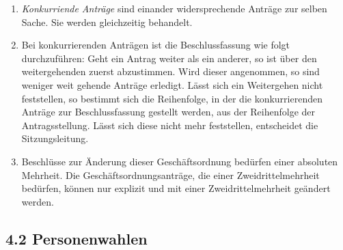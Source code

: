 \documentclass[12pt,oneside]{scrartcl}
\begin{document}
\begin{enumerate}
\item \emph{Konkurriende Anträge} sind einander widersprechende Anträge zur selben Sache.
Sie werden gleichzeitig behandelt.

\item Bei konkurrierenden Anträgen ist die Beschlussfassung wie folgt durchzuführen:
Geht ein Antrag weiter als ein anderer, so ist über den weitergehenden
zuerst abzustimmen.
Wird dieser angenommen, so sind weniger weit gehende Anträge erledigt.
Lässt sich ein Weitergehen nicht feststellen, so bestimmt sich die
Reihenfolge, in der die konkurrierenden Anträge zur Beschlussfassung
gestellt werden, aus der Reihenfolge der Antragsstellung.
Lässt sich diese nicht mehr feststellen, entscheidet die Sitzungsleitung.

\item Beschlüsse zur Änderung dieser Geschäftsordnung bedürfen einer absoluten
Mehrheit.
Die Geschäftsordnungsanträge, die einer Zweidrittelmehrheit bedürfen, können nur
explizit und mit einer Zweidrittelmehrheit geändert werden.
\end{enumerate}


\subsection{4.2 Personenwahlen%
  \label{personenwahlen}%
}
\end{document}
